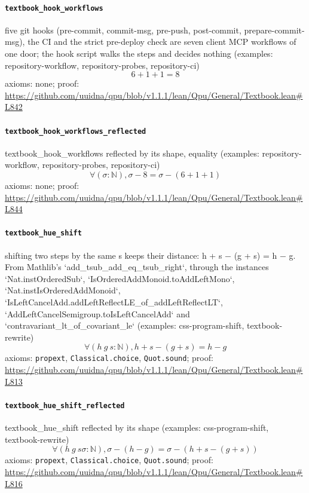 \documentclass[11pt]{article}
\begin{document}
\paragraph{\texttt{textbook\_hook\_workflows}}
five git hooks (pre-commit, commit-msg, pre-push, post-commit, prepare-commit-msg), the CI and the strict pre-deploy check are seven client MCP workflows of one door; the hook script walks the steps and decides nothing (examples: repository-workflow, repository-probes, repository-ci)
\[ 6 + 1 + 1 = 8 \]
\noindent axioms: none; proof: \url{https://github.com/uuidna/qpu/blob/v1.1.1/lean/Qpu/General/Textbook.lean\#L842}

\paragraph{\texttt{textbook\_hook\_workflows\_reflected}}
textbook\_hook\_workflows reflected by its shape, equality (examples: repository-workflow, repository-probes, repository-ci)
\[ \forall (\sigma : \mathbb{N}), \sigma - 8 = \sigma - (6 + 1 + 1) \]
\noindent axioms: none; proof: \url{https://github.com/uuidna/qpu/blob/v1.1.1/lean/Qpu/General/Textbook.lean\#L844}

\paragraph{\texttt{textbook\_hue\_shift}}
shifting two steps by the same s keeps their distance: h + s − (g + s) = h − g. From Mathlib's `add\_tsub\_add\_eq\_tsub\_right`, through the instances `Nat.instOrderedSub`, `IsOrderedAddMonoid.toAddLeftMono`, `Nat.instIsOrderedAddMonoid`, `IsLeftCancelAdd.addLeftReflectLE\_of\_addLeftReflectLT`, `AddLeftCancelSemigroup.toIsLeftCancelAdd` and `contravariant\_lt\_of\_covariant\_le` (examples: css-program-shift, textbook-rewrite)
\[ \forall (h\ g\ s : \mathbb{N}), h + s - (g + s) = h - g \]
\noindent axioms: \texttt{propext}, \texttt{Classical.choice}, \texttt{Quot.sound}; proof: \url{https://github.com/uuidna/qpu/blob/v1.1.1/lean/Qpu/General/Textbook.lean\#L813}

\paragraph{\texttt{textbook\_hue\_shift\_reflected}}
textbook\_hue\_shift reflected by its shape (examples: css-program-shift, textbook-rewrite)
\[ \forall (h\ g\ s \sigma : \mathbb{N}), \sigma - (h - g) = \sigma - (h + s - (g + s)) \]
\noindent axioms: \texttt{propext}, \texttt{Classical.choice}, \texttt{Quot.sound}; proof: \url{https://github.com/uuidna/qpu/blob/v1.1.1/lean/Qpu/General/Textbook.lean\#L816}
\end{document}
